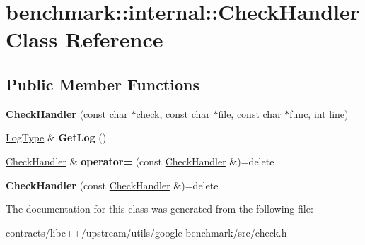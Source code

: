\hypertarget{classbenchmark_1_1internal_1_1_check_handler}{}\section{benchmark\+:\+:internal\+:\+:Check\+Handler Class Reference}
\label{classbenchmark_1_1internal_1_1_check_handler}
\subsection*{Public Member Functions}
\begin{DoxyCompactItemize}
\item 
\mbox{\label{classbenchmark_1_1internal_1_1_check_handler_a2958ffc7cb50f48a16f6b45f09d3f8b7}} 
{\bfseries Check\+Handler} (const char $\ast$check, const char $\ast$file, const char $\ast$\mbox{\hyperlink{structfunc}{func}}, int line)
\item 
\mbox{\label{classbenchmark_1_1internal_1_1_check_handler_a35ad0d59412fae13bbd8ab08cbd06b39}} 
\mbox{\hyperlink{classbenchmark_1_1internal_1_1_log_type}{Log\+Type}} \& {\bfseries Get\+Log} ()
\item 
\mbox{\label{classbenchmark_1_1internal_1_1_check_handler_a4921f95a7571244a15d77cd5bd616ca5}} 
\mbox{\hyperlink{classbenchmark_1_1internal_1_1_check_handler}{Check\+Handler}} \& {\bfseries operator=} (const \mbox{\hyperlink{classbenchmark_1_1internal_1_1_check_handler}{Check\+Handler}} \&)=delete
\item 
\mbox{\label{classbenchmark_1_1internal_1_1_check_handler_a26ad5d193d02d14f21f087abf012d151}} 
{\bfseries Check\+Handler} (const \mbox{\hyperlink{classbenchmark_1_1internal_1_1_check_handler}{Check\+Handler}} \&)=delete
\end{DoxyCompactItemize}


The documentation for this class was generated from the following file\+:\begin{DoxyCompactItemize}
\item 
contracts/libc++/upstream/utils/google-\/benchmark/src/check.\+h\end{DoxyCompactItemize}
